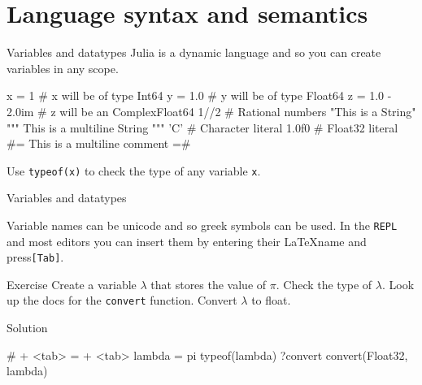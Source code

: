 \documentclass{beamer}
\newenvironment{Boxx}{\begin{tcolorbox}[standard jigsaw, opacityframe=0.8, opacityback=0.0]}{\end{tcolorbox}}
\begin{document}
\section{Language syntax and semantics}
\begin{frame}[fragile]{Variables and datatypes}
  Julia is a dynamic language and so you can create variables in any scope.
  \begin{Boxx}
  \begin{jllisting}
  x = 1   # x will be of type Int64
  y = 1.0 # y will be of type Float64
  z = 1.0 - 2.0im # z will be an Complex{Float64}
  1//2 # Rational numbers
  "This is a String"
  """
  This is a multiline
  String
  """
  'C' # Character literal
  1.0f0 # Float32 literal
  #=
  This is a multiline comment
  =#
  \end{jllisting}
\end{Boxx}
  Use \verb|typeof(x)| to check the type of any variable \verb|x|.
\end{frame}

\begin{frame}[fragile]{Variables and datatypes}
	
	Variable names can be unicode and so greek symbols can be used. In the \verb|REPL| and most editors you can insert them by entering their \LaTeX name and press\verb|[Tab]|.
	
	\begin{block}{Exercise}
		Create a variable $\lambda$ that stores the value of $\pi$.
		Check the type of $\lambda$.
		Look up the docs for the \verb|convert| function.
		Convert $\lambda$ to float.
	\end{block}
	\vfill
	\begin{block}{Solution}
		\vspace*{1mm}
		\begin{jllisting}
  # \lambda + <tab> = \pi + <tab>
  lambda = pi
  typeof(lambda)
  ?convert
  convert(Float32, lambda)
		\end{jllisting}
	\vspace*{1mm}
	\end{block}
\end{frame}
\end{document}
